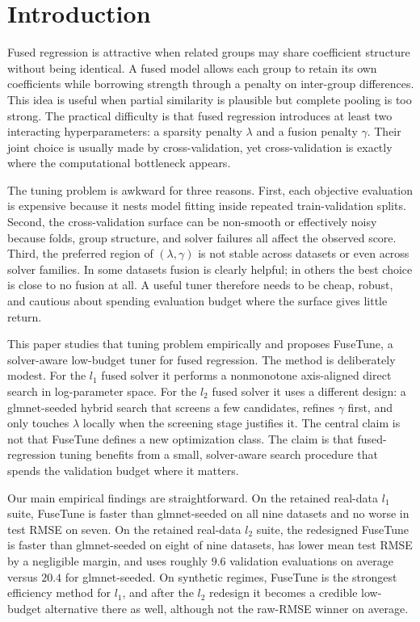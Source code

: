 \documentclass[pdflatex,iicol,sn-mathphys-num]{sn-jnl}
\newcommand{\method}{\textsc{FuseTune}}
\def\textsc#1{#1}%
\def\texttt#1{#1}%
\def\method{FuseTune}%
\def\ell{l}%
\begin{document}
\section{Introduction}
Fused regression is attractive when related groups may share coefficient structure without being identical. A fused model allows each group to retain its own coefficients while borrowing strength through a penalty on inter-group differences. This idea is useful when partial similarity is plausible but complete pooling is too strong. The practical difficulty is that fused regression introduces at least two interacting hyperparameters: a sparsity penalty \(\lambda\) and a fusion penalty \(\gamma\). Their joint choice is usually made by cross-validation, yet cross-validation is exactly where the computational bottleneck appears.

The tuning problem is awkward for three reasons. First, each objective evaluation is expensive because it nests model fitting inside repeated train-validation splits. Second, the cross-validation surface can be non-smooth or effectively noisy because folds, group structure, and solver failures all affect the observed score. Third, the preferred region of \((\lambda,\gamma)\) is not stable across datasets or even across solver families. In some datasets fusion is clearly helpful; in others the best choice is close to no fusion at all. A useful tuner therefore needs to be cheap, robust, and cautious about spending evaluation budget where the surface gives little return.

This paper studies that tuning problem empirically and proposes \method{}, a solver-aware low-budget tuner for fused regression. The method is deliberately modest. For the \(\ell_1\) fused solver it performs a nonmonotone axis-aligned direct search in log-parameter space. For the \(\ell_2\) fused solver it uses a different design: a \texttt{glmnet}-seeded hybrid search that screens a few candidates, refines \(\gamma\) first, and only touches \(\lambda\) locally when the screening stage justifies it. The central claim is not that \method{} defines a new optimization class. The claim is that fused-regression tuning benefits from a small, solver-aware search procedure that spends the validation budget where it matters.

Our main empirical findings are straightforward. On the retained real-data \(\ell_1\) suite, \method{} is faster than \texttt{glmnet}-seeded on all nine datasets and no worse in test RMSE on seven. On the retained real-data \(\ell_2\) suite, the redesigned \method{} is faster than \texttt{glmnet}-seeded on eight of nine datasets, has lower mean test RMSE by a negligible margin, and uses roughly \(9.6\) validation evaluations on average versus \(20.4\) for \texttt{glmnet}-seeded. On synthetic regimes, \method{} is the strongest efficiency method for \(\ell_1\), and after the \(\ell_2\) redesign it becomes a credible low-budget alternative there as well, although not the raw-RMSE winner on average.
\end{document}
